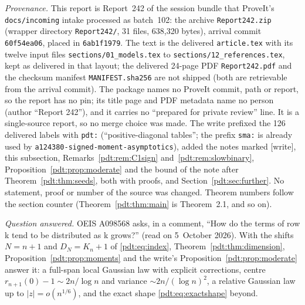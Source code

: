 \begin{writenote}
\emph{Provenance.} This report is Report~242 of the session bundle that
ProveIt's \nolinkurl{docs/incoming} intake processed as batch~102: the
archive \nolinkurl{Report242.zip} (wrapper directory \nolinkurl{Report242/},
31 files, 638{,}320 bytes), arrival commit \nolinkurl{60f54ea06}, placed in
\nolinkurl{6ab1f1979}. The text is the delivered \nolinkurl{article.tex}
with its twelve input files \nolinkurl{sections/01_models.tex} to
\nolinkurl{sections/12_references.tex}, kept as delivered in that layout;
the delivered 24-page PDF \nolinkurl{Report242.pdf} and the checksum
manifest \nolinkurl{MANIFEST.sha256} are not shipped (both are retrievable
from the arrival commit). The package names no ProveIt commit, path or
report, so the report has no pin; its title page and PDF metadata name no
person (author ``Report 242''), and it carries no ``prepared for private
review'' line. It is a single-source report, so no merge choice was made.
The write prefixed the 126 delivered labels with \nolinkurl{pdt:}
(``positive-diagonal tables''; the prefix \nolinkurl{sma:} is already used by
\nolinkurl{a124380-signed-moment-asymptotics}), added the notes marked
[write], this subsection, Remarks~\ref{pdt:rem:C1sign}
and~\ref{pdt:rem:slowbinary}, Proposition~\ref{pdt:prop:moderate} and the
bound of the note after Theorem~\ref{pdt:thm:seeds}, both with proofs, and
Section~\ref{pdt:sec:further}. No statement, proof or number of the source
was changed. Theorem numbers follow the section counter
(Theorem~\ref{pdt:thm:main} is Theorem~2.1, and so on).

\emph{Question answered.} OEIS A098568 asks, in a comment, ``How do the
terms of row k tend to be distributed as k grows?'' (read on 5~October
2026). With the shifts $N=n+1$ and $D_N=K_n+1$ of \eqref{pdt:eq:index},
Theorem~\ref{pdt:thm:dimension}, Proposition~\ref{pdt:prop:moments} and the
write's Proposition~\ref{pdt:prop:moderate} answer it: a full-span local
Gaussian law with explicit corrections, centre $r_{n+1}(0)-1\sim2n/\log n$
and variance $\sim2n/(\log n)^2$, a relative Gaussian law up to
$|z|=o(n^{1/6})$, and the exact shape \eqref{pdt:eq:exactshape} beyond.


\end{writenote}
